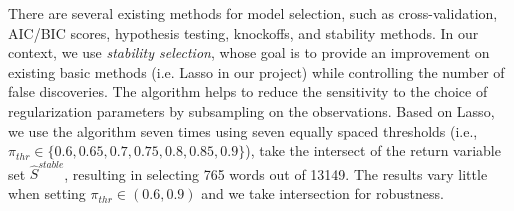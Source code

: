 \documentclass[12pt]{article}
\begin{document}
	There are several existing methods for model selection, such as cross-validation, AIC/BIC scores, hypothesis testing, knockoffs, and stability methods. In our context, we use \textit{stability selection}\cite{meinshausen2010stability}, whose goal is to provide an improvement on existing basic methods (i.e. Lasso in our project) while controlling the number of false discoveries. The algorithm helps to reduce the sensitivity to the choice of regularization parameters by subsampling on the observations. Based on Lasso, we use the algorithm seven times using seven equally spaced thresholds (i.e., $\pi_{thr}\in \{0.6, 0.65, 0.7, 0.75, 0.8, 0.85, 0.9\}$), take the intersect of the return variable set $\hat{S}^{stable}$, resulting in selecting 765 words out of 13149. The results vary little when setting $\pi_{thr}\in (0.6, 0.9)$ and we take intersection for robustness.
	

	
\end{document}
